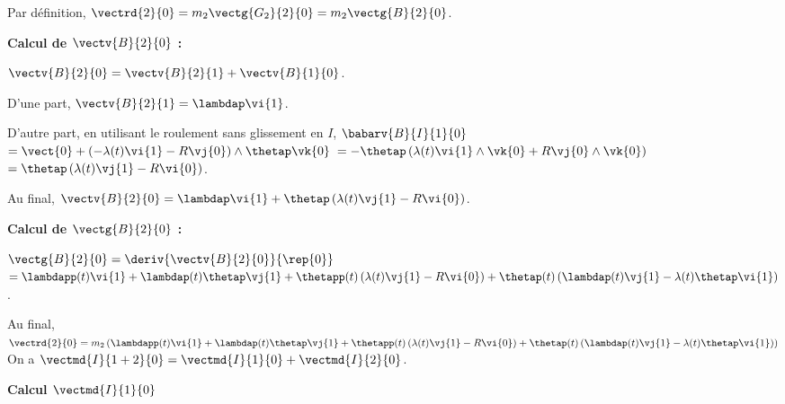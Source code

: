 \begin{corrigebox}
Par définition, $\vectrd{2}{0} =  m_2 \vectg{G_2}{2}{0}=  m_2 \vectg{B}{2}{0}$.

\vspace{.5cm}

\textbf{Calcul de $ \vectv{B}{2}{0}$ :}

$\vectv{B}{2}{0}=\vectv{B}{2}{1}+\vectv{B}{1}{0}$.

D'une part,  $\vectv{B}{2}{1}=\lambdap\vi{1}$.

D'autre part, en utilisant le roulement sans glissement en $I$, 
$\babarv{B}{I}{1}{0} $ $=\vect{0}+\left(-\lambda(t)\vi{1}-R\vj{0} \right)\wedge\thetap \vk{0}$
$=-\thetap\left(\lambda(t)\vi{1}\wedge \vk{0}+R\vj{0}\wedge \vk{0} \right)$
$=\thetap\left(\lambda(t)\vj{1}-R\vi{0} \right)$.

Au final, $\vectv{B}{2}{0} = \lambdap\vi{1} + \thetap\left(\lambda(t)\vj{1}-R\vi{0} \right)$.

\vspace{.5cm}

\textbf{Calcul de $ \vectg{B}{2}{0}$ :}

$\vectg{B}{2}{0} = \deriv{\vectv{B}{2}{0}}{\rep{0}}$
$ = \lambdapp(t)\vi{1} +\lambdap(t)\thetap\vj{1} 
+ \thetapp(t)\left(\lambda(t)\vj{1}-R\vi{0} \right)
+ \thetap(t)\left(\lambdap(t)\vj{1}-\lambda(t)\thetap\vi{1} \right)
$.

Au final, $\vectrd{2}{0} =  m_2 \left( \lambdapp(t)\vi{1} +\lambdap(t)\thetap\vj{1} 
+ \thetapp(t)\left(\lambda(t)\vj{1}-R\vi{0} \right)
+ \thetap(t)\left(\lambdap(t)\vj{1}-\lambda(t)\thetap\vi{1} \right)\right)$
On a $\vectmd{I}{1+2}{0} = \vectmd{I}{1}{0} + \vectmd{I}{2}{0}$.

\textbf{Calcul $\vectmd{I}{1}{0}$}


\end{corrigebox}
